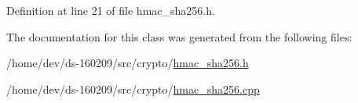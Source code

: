 Definition at line 21 of file hmac\+\_\+sha256.\+h.



The documentation for this class was generated from the following files\+:\begin{DoxyCompactItemize}
\item 
/home/dev/ds-\/160209/src/crypto/\hyperlink{hmac__sha256_8h}{hmac\+\_\+sha256.\+h}\item 
/home/dev/ds-\/160209/src/crypto/\hyperlink{hmac__sha256_8cpp}{hmac\+\_\+sha256.\+cpp}\end{DoxyCompactItemize}
